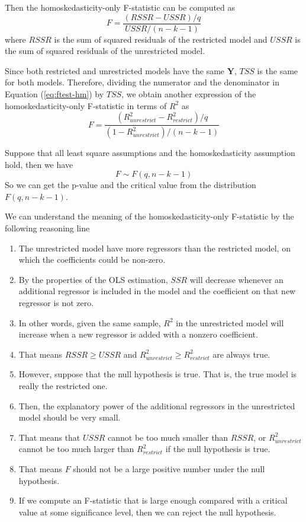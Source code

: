 \documentclass[a4paper,11pt]{article}
\begin{document}
Then the homoskedasticity-only F-statistic can
be computed as
\begin{equation}
\label{eq:ftest-hm}
F = \frac{(RSSR - USSR)/q}{USSR/(n-k-1)}
\end{equation}
where \(RSSR\) is the sum of squared residuals of the restricted model
and \(USSR\) is the sum of squared residuals of the unrestricted model.

Since both restricted and unrestricted models have the same
\(\mathbf{Y}\), \(TSS\) is the same for both models. Therefore, dividing
the numerator and the denominator in Equation (\ref{eq:ftest-hm}) by
\(TSS\), we obtain another expression of the homoskedasticity-only
F-statistic in terms of \(R^2\) as
\begin{equation}
\label{eq:ftest-hm-r}
F = \frac{(R^2_{unrestrict} - R^2_{restrict})/q}{(1 - R^2_{unrestrict})/(n-k-1)}
\end{equation}

Suppose that all least square assumptions and the homoskedasticity
assumption hold, then we have
\[ F \sim F(q, n-k-1) \]
So we can get the p-value and the critical value from the
distribution \(F(q, n-k-1)\).

We can understand the meaning of the homoskedasticity-only F-statistic
by the following reasoning line
\begin{enumerate}
\item The unrestricted model have more regressors than the restricted
model, on which the coefficients could be non-zero.
\item By the properties of the OLS estimation, \(SSR\) will decrease whenever
an additional regressor is included in the model and the
coefficient on that new regressor is not zero.
\item In other words, given the same sample, \(R^2\) in the unrestricted
model will increase when a new regressor is added with a nonzero
coefficient.
\item That means \(RSSR \geq USSR\) and \(R^2_{unrestrict} \geq R^2_{restrict}\)
are always true.
\item However, suppose that the null hypothesis is true. That is, the
true model is really the restricted one.
\item Then, the explanatory power of the additional regressors in the
unrestricted model should be very small.
\item That means that \(USSR\) cannot be too much smaller than \(RSSR\), or
\(R^2_{unrestrict}\) cannot be too much larger than \(R^2_{restrict}\)
if the null hypothesis is true.
\item That means \(F\) should not be a large positive number under the null
hypothesis.
\item If we compute an F-statistic that is large enough compared with a
critical value at some significance level, then we can reject the
null hypothesis.
\end{enumerate}
\end{document}
